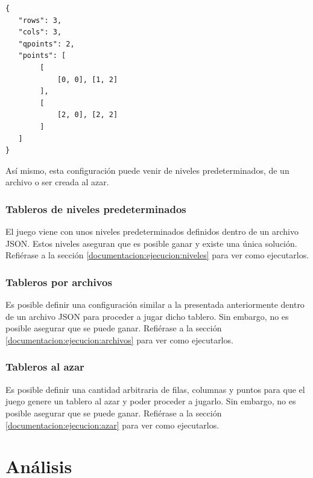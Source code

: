 \documentclass[letter,12pt]{article}
\begin{document}
\begin{verbatim}
{
   "rows": 3,
   "cols": 3,
   "qpoints": 2,
   "points": [
        [
            [0, 0], [1, 2]
        ],
        [
            [2, 0], [2, 2]
        ]
   ]
}
\end{verbatim}

Así mismo, esta configuración puede venir de niveles predeterminados, de un archivo o ser creada al azar. \par

\subsubsection{Tableros de niveles predeterminados} \label{implementacion:configuracion:niveles}

El juego viene con unos niveles predeterminados definidos dentro de un archivo JSON. Estos niveles aseguran que es posible ganar y existe una única solución. Refiérase a la sección \ref{documentacion:ejecucion:niveles} para ver como ejecutarlos. \par

\subsubsection{Tableros por archivos} \label{implementacion:configuracion:archivos}

Es posible definir una configuración similar a la presentada anteriormente dentro de un archivo JSON para proceder a jugar dicho tablero. Sin embargo, no es posible asegurar que se puede ganar. Refiérase a la sección \ref{documentacion:ejecucion:archivos} para ver como ejecutarlos. \par

\subsubsection{Tableros al azar} \label{implementacion:configuracion:azar}

Es posible definir una cantidad arbitraria de filas, columnas y puntos para que el juego genere un tablero al azar y poder proceder a jugarlo. Sin embargo, no es posible asegurar que se puede ganar. Refiérase a la sección \ref{documentacion:ejecucion:azar} para ver como ejecutarlos. \par

\newpage



\section{Análisis} \label{analisis}
\end{document}
